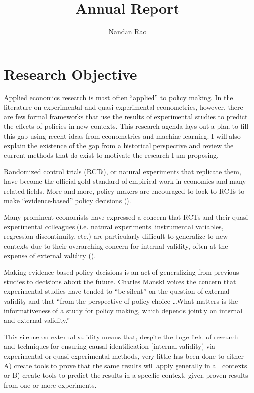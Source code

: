 \documentclass[a4paper,12pt]{article}
\title{ Annual Report }
\author{ Nandan Rao }
\begin{document}
\maketitle

\section { Research Objective }

Applied economics research is most often ``applied'' to policy making. In the literature on experimental and quasi-experimental econometrics, however, there are few formal frameworks that use the results of experimental studies to predict the effects of policies in new contexts. This research agenda lays out a plan to fill this gap using recent ideas from econometrics and machine learning. I will also explain the existence of the gap from a historical perspective and review the current methods that do exist to motivate the research I am proposing.

Randomized control trials (RCTs), or natural experiments that replicate them, have become the official gold standard of empirical work in economics and many related fields. More and more, policy makers are encouraged to look to RCTs to make ``evidence-based'' policy decisions (\cite{Manski2013, Cartwright2013}).

Many prominent economists have expressed a concern that RCTs and their quasi-experimental colleagues (i.e. natural experiments, instrumental variables, regression discontinuity, etc.) are particularly difficult to generalize to new contexts due to their overarching concern for internal validity, often at the expense of external validity (\cite{Heckman1995, Heckman2008, Deaton2010, Manski2013, Deaton2018}).

Making evidence-based policy decisions is an act of generalizing from previous studies to decisions about the future. Charles Manski \parencite*{Manski2013} voices the concern that experimental studies have tended to ``be silent'' on the question of external validity and that ``from the perspective of policy choice \ldots What matters is the informativeness of a study for policy making, which depends jointly on internal and external validity.''

This silence on external validity means that, despite the huge field of research and techniques for ensuring causal identification (internal validity) via experimental or quasi-experimental methods, very little has been done to either A) create tools to prove that the same results will apply generally in all contexts or B) create tools to predict the results in a specific context, given proven results from one or more experiments.
\end{document}
